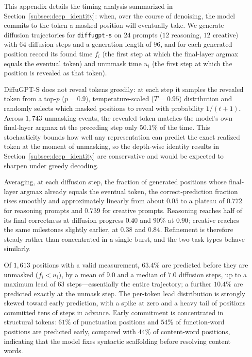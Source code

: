 \documentclass{article} %
\begin{document}
This appendix details the timing analysis summarized in Section~\ref{subsec:deep_identity}: when, over the course of denoising, the model commits to the token a masked position will eventually take. We generate diffusion trajectories for \texttt{diffugpt-s} on $24$ prompts ($12$ reasoning, $12$ creative) with $64$ diffusion steps and a generation length of $96$, and for each generated position record its found time $f_i$ (the first step at which the final-layer argmax equals the eventual token) and unmmask time $u_i$ (the first step at which the position is revealed as that token).

DiffuGPT-S does not reveal tokens greedily: at each step it samples the revealed token from a top-$p$ ($p{=}0.9$), temperature-scaled ($T{=}0.95$) distribution and randomly selects which masked positions to reveal with probability $1/(t{+}1)$. Across $1{,}743$ unmasking events, the revealed token matches the model's own final-layer argmax at the preceding step only $50.1\%$ of the time. This stochasticity bounds how well any representation can predict the exact realized token at the moment of unmasking, so the depth-wise identity results in Section~\ref{subsec:deep_identity} are conservative and would be expected to sharpen under greedy decoding.

Averaging, at each diffusion step, the fraction of generated positions whose final-layer argmax already equals the eventual token, the correct-prediction fraction rises smoothly and approximately linearly from about $0.05$ to a plateau of $0.772$ for reasoning prompts and $0.739$ for creative prompts. Reasoning reaches half of its final correctness at diffusion progress $0.40$ and $90\%$ at $0.90$; creative reaches the same milestones slightly earlier, at $0.38$ and $0.84$. Refinement is therefore steady rather than concentrated in a single burst, and the two task types behave similarly.

Of $1{,}613$ positions with a valid measurement, $63.4\%$ are predicted before they are unmasked ($f_i < u_i$), by a mean of $9.0$ and a median of $7.0$ diffusion steps, up to a maximum lead of $63$ steps---essentially the entire trajectory; a further $10.4\%$ are predicted exactly at the unmask step. The per-token lead distribution is strongly skewed toward early prediction, with a spike at zero and a heavy tail of positions committed tens of steps in advance. Early commitment is concentrated in structural tokens: $61\%$ of punctuation positions and $54\%$ of function-word positions are predicted early, compared with $44\%$ of content-word positions, indicating that the model fixes syntactic scaffolding before resolving content words.
\end{document}
